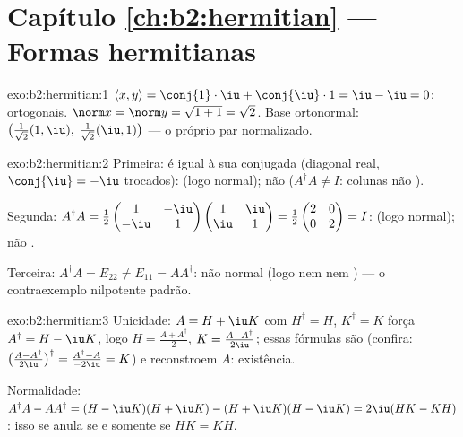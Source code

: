 \section*{Capítulo \ref{ch:b2:hermitian} --- Formas hermitianas}

\begin{solution}{exo:b2:hermitian:1}
$\langle x, y\rangle = \conj{1}\cdot\iu + \conj{\iu}\cdot 1 = \iu -
\iu = 0$: ortogonais. $\norm x = \norm y = \sqrt{1 + 1} = \sqrt2$.
Base ortonormal: $\bigl(\frac{1}{\sqrt2}(1, \iu),\;
\frac{1}{\sqrt2}(\iu, 1)\bigr)$ --- o próprio par normalizado.
\end{solution}

\begin{solution}{exo:b2:hermitian:2}
Primeira: é igual à sua  conjugada (diagonal real, $\conj{\iu} =
-\iu$ trocados):  (logo normal); não  ($A^\dagger A
\neq I$: colunas não ).

Segunda: $A^\dagger A = \frac12\begin{pmatrix} 1 & -\iu\\ -\iu &
1\end{pmatrix}\begin{pmatrix} 1 & \iu\\ \iu & 1\end{pmatrix} =
\frac12\begin{pmatrix} 2 & 0\\ 0 & 2\end{pmatrix} = I$: 
(logo normal); não .

Terceira: $A^\dagger A = E_{22} \neq E_{11} = AA^\dagger$: não normal
(logo nem  nem ) --- o contraexemplo nilpotente
padrão.
\end{solution}

\begin{solution}{exo:b2:hermitian:3}
Unicidade: $A = H + \iu K$ com $H^\dagger = H$, $K^\dagger = K$
força $A^\dagger = H - \iu K$, logo $H = \frac{A + A^\dagger}{2}$,
$K = \frac{A - A^\dagger}{2\iu}$; essas fórmulas são 
(confira: $\bigl(\frac{A - A^\dagger}{2\iu}\bigr)^\dagger = \frac{
A^\dagger - A}{-2\iu} = K$) e reconstroem $A$: existência.

Normalidade: $A^\dagger A - AA^\dagger = (H - \iu K)(H + \iu K) - (H
+ \iu K)(H - \iu K) = 2\iu(HK - KH)$: isso se anula se e somente se $HK = KH$.
\end{solution}

